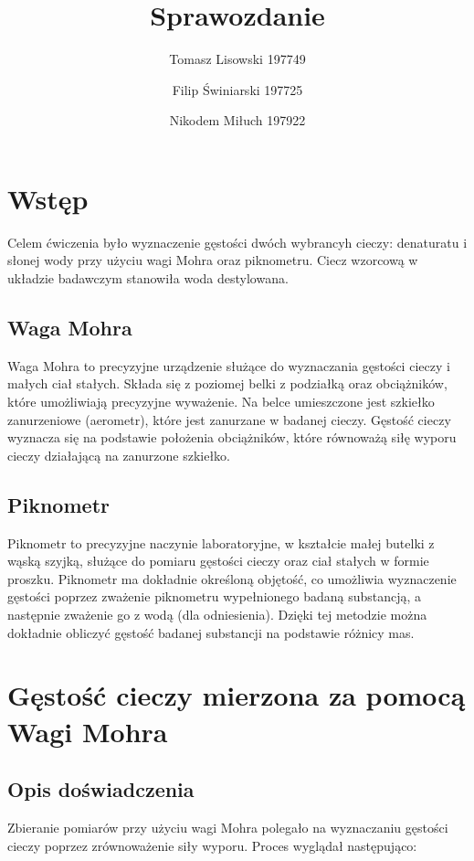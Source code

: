 \documentclass{article} %
\title{Sprawozdanie}
\author{Tomasz Lisowski 197749\and Filip Świniarski 197725\and Nikodem Miłuch 197922}
\begin{document}
\maketitle

\section{Wstęp}

Celem ćwiczenia było wyznaczenie gęstości dwóch wybrancyh cieczy: denaturatu i słonej wody przy użyciu wagi Mohra oraz piknometru. Ciecz wzorcową w układzie badawczym stanowiła woda destylowana.

\subsection{Waga Mohra}

Waga Mohra to precyzyjne urządzenie służące do wyznaczania gęstości cieczy i małych ciał stałych. Składa się z poziomej belki z podziałką oraz obciążników, które umożliwiają precyzyjne wyważenie. Na belce umieszczone jest szkiełko zanurzeniowe (aerometr), które jest zanurzane w badanej cieczy. Gęstość cieczy wyznacza się na podstawie położenia obciążników, które równoważą siłę wyporu cieczy działającą na zanurzone szkiełko.

\subsection{Piknometr}

Piknometr to precyzyjne naczynie laboratoryjne, w kształcie małej butelki z wąską szyjką, służące do pomiaru gęstości cieczy oraz ciał stałych w formie proszku. Piknometr ma dokładnie określoną objętość, co umożliwia wyznaczenie gęstości poprzez zważenie piknometru wypełnionego badaną substancją, a następnie zważenie go z wodą (dla odniesienia). Dzięki tej metodzie można dokładnie obliczyć gęstość badanej substancji na podstawie różnicy mas.


\section{Gęstość cieczy mierzona za pomocą Wagi Mohra}

\subsection{Opis doświadczenia}

Zbieranie pomiarów przy użyciu wagi Mohra polegało na wyznaczaniu gęstości cieczy poprzez zrównoważenie siły wyporu. Proces wyglądał następująco:
\end{document}
